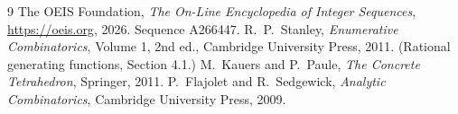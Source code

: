 \documentclass[11pt,a4paper]{article}
\theoremstyle{plain}
\theoremstyle{definition}
\begin{document}
\begin{thebibliography}{9}
 The OEIS Foundation, \emph{The On-Line Encyclopedia of Integer
Sequences}, \url{https://oeis.org}, 2026. Sequence A266447.
 R.~P.~Stanley, \emph{Enumerative Combinatorics}, Volume 1, 2nd ed.,
Cambridge University Press, 2011. (Rational generating functions, Section 4.1.)
 M.~Kauers and P.~Paule, \emph{The Concrete Tetrahedron}, Springer, 2011.
 P.~Flajolet and R.~Sedgewick, \emph{Analytic Combinatorics}, Cambridge
University Press, 2009.
\end{thebibliography}
\end{document}
